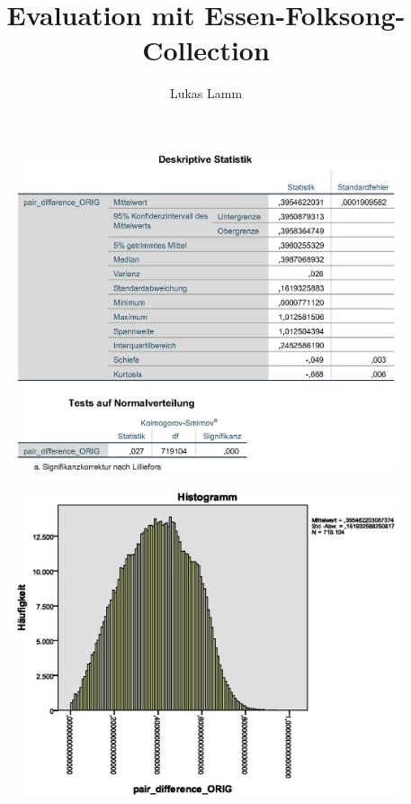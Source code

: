 \documentclass[]{report}
\title{Evaluation mit Essen-Folksong-Collection}
\author{Lukas Lamm}
\begin{document}
\maketitle

\begin{figure}[htb]
\includegraphics[width=\textwidth]{images/deskriptive_statistik.eps}
\end{figure}

\begin{figure}[htb]
	\includegraphics[width=\textwidth]{images/pair_difference_orig_histogram.eps}
\end{figure}
\end{document}
